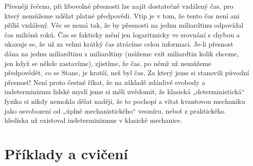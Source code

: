     Přesněji řečeno, při libovolné přesnosti lze najít dostatečně vzdálený čas, pro který nemůžeme
    udělat platné předpovědi. Vtip je v tom, že tento čas není ani příliš vzdálený. Věc se nemá tak,
    že by přesnosti na jednu miliardtinu odpovídal čas miliónů roků. Čas se fakticky mění jen
    logaritmicky ve srovnání s chybou a ukazuje se, že už za velmi krátký čas ztrácíme celou
    informaci. Je-li přesnost dána na jednu miliardtinu z miliardtiny (můžeme vzít miliardtin kolik
    chceme, jen když se někde zastavíme), zjistíme, že čas, po němž už nemůžeme předpovědět, co se
    Stane, je kratší, než byl čas, Za který jsme si stanovili původní přesnost! Není proto čestné
    říkat, že na základě zdánlivé svobody a indeterminizmu lidské myslí jsme si měli uvědomit, že
    klasická „deterministická“ fyzika si nikdy nemohla dělat naději, že to pochopí a vítat kvantovou
    mechaniku jako osvobození od „úplně mechanistického“ vesmíru, neboť z praktického hlediska už
    existoval indeterminizmus v klasické mechanice.
  
  \section{Příklady a cvičení}\label{fyz:IchapXXXVIIIsecVII}
